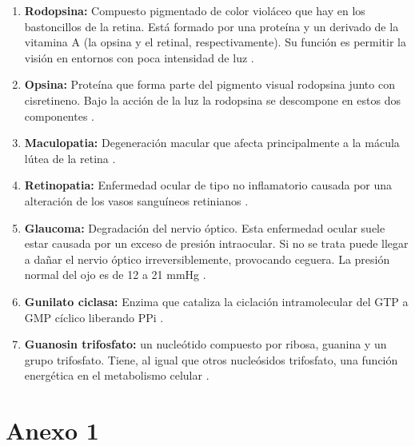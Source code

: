 \documentclass[10pt]{article}
\begin{document}
\begin{enumerate}
\item \textbf{Rodopsina:} Compuesto pigmentado de color violáceo que hay en los bastoncillos de la retina. Está formado por una proteína y un derivado de la vitamina A (la opsina y el retinal, respectivamente). Su función es permitir la visión en entornos con poca intensidad de luz \cite{IEEEreferencias:Ref38}.
\item \textbf{Opsina:} Proteína que forma parte del pigmento visual rodopsina junto con cisretineno. Bajo la acción de la luz la rodopsina se descompone en estos dos componentes \cite{IEEEreferencias:Ref39}.
\item \textbf{Maculopatia:} Degeneración macular que afecta principalmente a la mácula lútea de la retina \cite{IEEEreferencias:Ref38}.
\item \textbf{Retinopatia:} Enfermedad ocular de tipo no inflamatorio causada por una alteración de los vasos sanguíneos retinianos \cite{IEEEreferencias:Ref38}.
\item \textbf{Glaucoma:} Degradación del nervio óptico. Esta enfermedad ocular suele estar causada por un exceso de presión intraocular. Si no se trata puede llegar a dañar el nervio óptico irreversiblemente, provocando ceguera. La presión normal del ojo es de 12 a 21 mmHg \cite{IEEEreferencias:Ref38}.
\item \textbf{Gunilato ciclasa:} Enzima que cataliza la ciclación intramolecular del GTP a GMP cíclico liberando PPi \cite{IEEEreferencias:Ref39}.
\item  \textbf{Guanosin trifosfato:} un nucleótido compuesto por ribosa, guanina y un grupo trifosfato. Tiene, al igual que otros nucleósidos trifosfato, una función energética en el metabolismo celular \cite{IEEEreferencias:Ref39}.

\end{enumerate}
\newpage
 
 

\appendix  
\clearpage %
\addappheadtotoc 
\appendixpage 

\section{Anexo 1}
\end{document}
